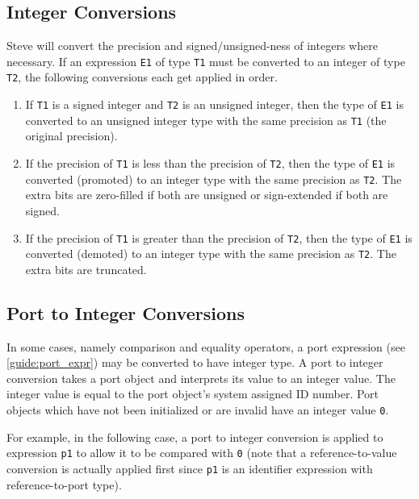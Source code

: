 \subsection{Integer Conversions} \label{guide:int_conv}

Steve will convert the precision and signed/unsigned-ness of integers where necessary. If an expression \texttt{E1} of type \texttt{T1} must be converted to an integer of type \texttt{T2}, the following conversions each get applied in order.

\begin{enumerate}
\item If \texttt{T1} is a signed integer and \texttt{T2} is an unsigned integer, then the type of \texttt{E1} is converted to an unsigned integer type with the same precision as \texttt{T1} (the original precision).

\item If the precision of \texttt{T1} is less than the precision of \texttt{T2}, then the type of \texttt{E1} is converted (promoted) to an integer type with the same precision as \texttt{T2}. The extra bits are zero-filled if both are unsigned or sign-extended if both are signed.

\item If the precision of \texttt{T1} is greater than the precision of \texttt{T2}, then the type of \texttt{E1} is converted (demoted) to an integer type with the same precision as \texttt{T2}. The extra bits are truncated.
\end{enumerate}

\subsection{Port to Integer Conversions} \label{guide:port_conv}

In some cases, namely comparison and equality operators, a port expression (see \ref{guide:port_expr}) may be converted to have integer type. A port to integer conversion takes a port object and interprets its value to an integer value. The integer value is equal to the port object's system assigned ID number. Port objects which have not been initialized or are invalid have an integer value \texttt{0}.

For example, in the following case, a port to integer conversion is applied to expression \texttt{p1} to allow it to be compared with \texttt{0} (note that a reference-to-value conversion is actually applied first since \texttt{p1} is an identifier expression with reference-to-port type).

